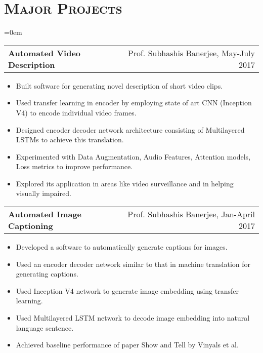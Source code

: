 \documentclass{article}
\makeatletter
\newcommand{\headerrow}[2]
{\begin{tabular*}{\linewidth}{l@{\extracolsep{\fill}}r}
	#1 &
	#2 \\
\end{tabular*}}
\newcommand{\tmpsection}[1]{}
\let\tmpsection=\section
\renewcommand{\section}[1]{\tmpsection*{\textsc{#1}}}
\makeatother
\begin{document}
\section{Major Projects}
\begin{list} {}{\leftmargin=0em}
\setlength{\leftmargin}{0pt}

    \item[]
    \headerrow {\textbf{Automated Video Description}}{Prof. Subhashis Banerjee, May-July 2017}
    \begin{itemize}
    \setlength\itemsep{0.0em}
        \item Built software for generating novel description of short video clips.
        \item Used transfer learning in encoder by employing state of art CNN (Inception V4) to encode individual video frames.
        \item Designed encoder decoder network architecture consisting of Multilayered LSTMs to achieve this translation.
        \item Experimented with Data Augmentation, Audio Features, Attention models, Loss metrics to improve performance.
        \item Explored its application in areas like video surveillance and in helping visually impaired.
    \end{itemize}

    \item[]
    \headerrow {\textbf{Automated Image Captioning}}{Prof. Subhashis Banerjee, Jan-April 2017}
    \begin{itemize}
    \setlength\itemsep{0.0em}
        \item Developed a software to automatically generate captions for images.
        \item Used an encoder decoder network similar to that in machine translation for generating captions.
        \item Used Inception V4 network to generate image embedding using transfer learning.
        \item Used Multilayered LSTM network to decode image embedding into natural language sentence.
        \item Achieved baseline performance of paper Show and Tell by Vinyals et al.
    \end{itemize}


\end{list}
\end{document}
